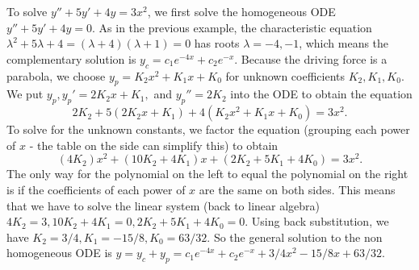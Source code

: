 \begin{example}
To solve $y''+5y'+4y=3x^2$, we first solve the homogeneous ODE $y''+5y'+4y=0$. As in the previous example, the characteristic equation $\lambda^2+5\lambda+4=(\lambda+4)(\lambda+1)=0$ has roots $\lambda=-4,-1$, which means the complementary solution is  $y_c = c_1e^{-4x}+c_2e^{-x}$.  Because the driving force is a parabola, we choose $y_p=K_2x^2+K_1x+K_0$ for unknown coefficients $K_2, K_1,K_0$.  We put $y_p, y_p' = 2K_2x+K_1,$ and $y_p'' = 2K_2$ into the ODE to obtain the equation $$2K_2+5(2K_2x+K_1)+4(K_2x^2+K_1x+K_0)=3x^2.
$$ To solve for the unknown constants, we factor the equation (grouping each power of $x$ - the table on the side can simplify  this) to obtain 
$$ (4K_2)x^2  + ( 10K_2 +4K_1)x + ( 2K_2 +5 K_1 + 4 K_0)= 3x^2. $$ The only way for the polynomial on the left to equal the polynomial on the right is if the coefficients of each power of $x$ are the same on both sides.  This means that we have to solve the linear system (back to linear algebra) $4K_2=3, 10K_2 +4K_1=0,2K_2 +5 K_1 + 4 K_0=0$.  Using back substitution, we have $K_2=3/4, K_1 = -15/8, K_0=63/32$. So the general solution to the non homogeneous ODE is $y=y_c+y_p = c_1e^{-4x}+c_2e^{-x} + 3/4x^2-15/8x+63/32$.
\end{example}

